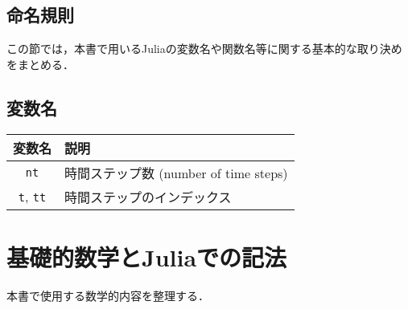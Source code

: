 \documentclass[titlepage]{ltjsbook}
\newcommand{\jl}{\lstinline[language=julia]}
\begin{document}
\subsection{命名規則}
この節では，本書で用いるJuliaの変数名や関数名等に関する基本的な取り決めをまとめる．

\subsection{変数名}
\begin{tabular}{cl} \hline
 変数名 & 説明\\\hline
  \jl{nt} & 時間ステップ数 (number of time steps)\\
  \jl{t}, \jl{tt} & 時間ステップのインデックス\\\hline
\end{tabular}

\section{基礎的数学とJuliaでの記法}
本書で使用する数学的内容を整理する．
\end{document}
